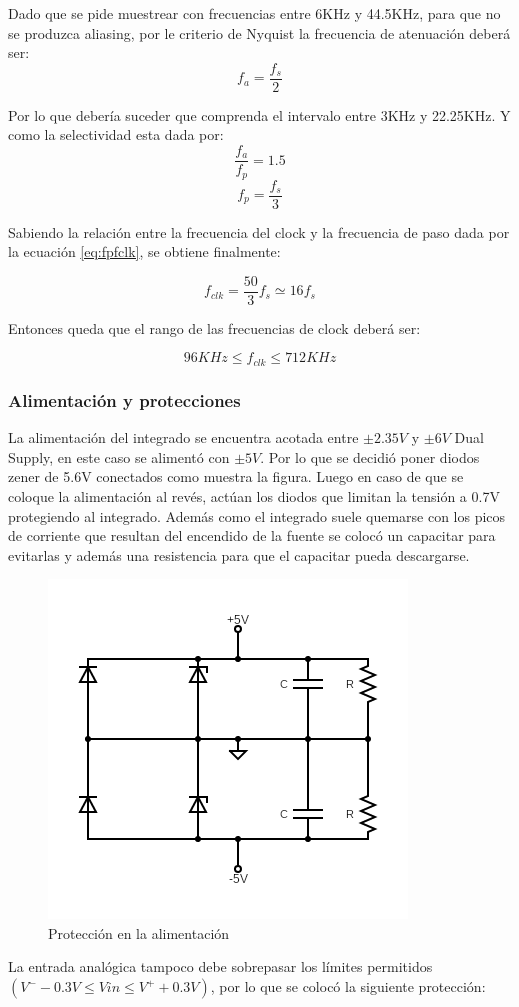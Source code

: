 \documentclass[assd_tp3_main.tex]{subfiles}
\begin{document}
Dado que se pide muestrear con frecuencias entre 6KHz y 44.5KHz, para que no se
produzca aliasing, por le criterio de Nyquist la frecuencia de atenuación deberá ser:
$$ f_{a} = \frac{f_s}{2}$$

Por lo que debería suceder que comprenda el intervalo entre 3KHz y 22.25KHz.
Y como la selectividad esta dada por:
$$\frac{f_a}{f_p}=1.5$$
$$f_p = \frac{f_s}{3}$$


Sabiendo la relación entre la frecuencia del clock y la frecuencia de paso dada por la
ecuación \ref{eq:fpfclk}, se obtiene finalmente:

$$ f_{clk} = \frac{50}{3}f_s \simeq 16f_s$$

Entonces queda que el rango de las frecuencias de clock deberá ser: 

$$ 96KHz \leq f_{clk} \leq 712KHz $$

\subsubsection{Alimentación y protecciones}
La alimentación del integrado se encuentra acotada entre $\pm 2.35V$ y $\pm6V$ Dual Supply,
en este caso se alimentó con $\pm5V$. Por lo que se decidió poner diodos zener de 5.6V
conectados como muestra la figura. Luego en caso de que se coloque la alimentación
al revés, actúan los diodos que limitan la tensión a 0.7V protegiendo al integrado.
Además como el integrado suele quemarse con los picos de corriente que resultan del
encendido de la fuente se colocó un capacitar para evitarlas y además una resistencia
para que el capacitar pueda descargarse. 

\begin{figure}[H]
	\centering
	\includegraphics[width=0.4 \textwidth]
	{images/ej1/proteccionalim.png}
	\caption{Protección en la alimentación}
	\label{fig:pal}
\end{figure}

La entrada analógica tampoco debe sobrepasar los límites permitidos
$(V^- - 0.3V \leq Vin \leq V^+ + 0.3V )$, por lo que se colocó la siguiente protección:
\end{document}
